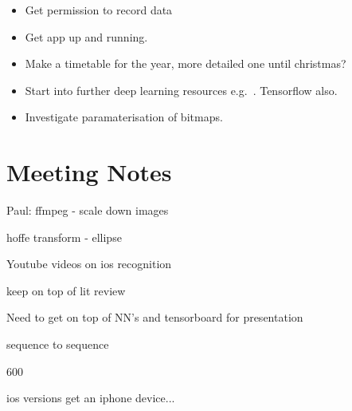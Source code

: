 \documentclass[]{weekly-report}
\begin{document}
\begin{itemize}
\item Get permission to record data

\item Get app up and running.

\item Make a timetable for the year, more detailed one until christmas?

\item Start into further deep learning resources e.g.~\cite{Ng-Coursera-2016, VincentVanhoucke-Udacity-2016, Nvidia-DL-Course-2016}. Tensorflow also.

\item Investigate paramaterisation of bitmaps.

\end{itemize}

\section{Meeting Notes}

Paul:
ffmpeg - scale down images

hoffe transform - ellipse

Youtube videos on ios recognition

keep on top of lit review

Need to get on top of NN's and tensorboard for presentation

sequence to sequence

600

ios versions
get an iphone device...



{}



\label{last_page}

 
\end{document}
